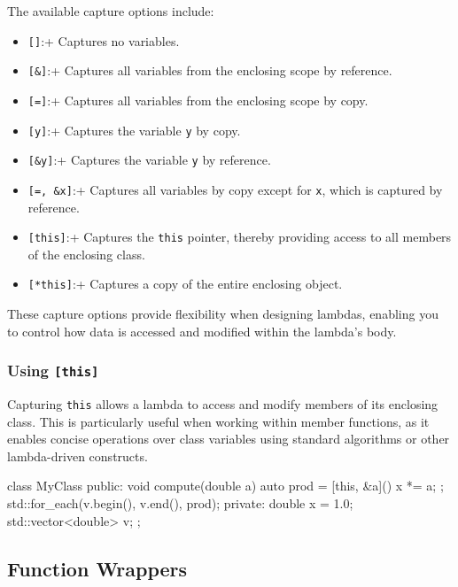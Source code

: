 \vspace{0.5em}

The available capture options include:

\begin{itemize}
    \item \texttt{[]}:+ Captures no variables.
    \item \texttt{[\&]}:+ Captures all variables from the enclosing scope by reference.
    \item \texttt{[=]}:+ Captures all variables from the enclosing scope by copy.
    \item \texttt{[y]}:+ Captures the variable \texttt{y} by copy.
    \item \texttt{[\&y]}:+ Captures the variable \texttt{y} by reference.
    \item \texttt{[=, \&x]}:+ Captures all variables by copy except for \texttt{x}, which is captured by reference.
    \item \texttt{[this]}:+ Captures the \texttt{this} pointer, thereby providing access to all members of the enclosing class.
    \item \texttt{[*this]}:+ Captures a copy of the entire enclosing object.
\end{itemize}

\vspace{0.5em}

These capture options provide flexibility when designing lambdas, enabling you to control how data is accessed and modified within the lambda's body.

\subsubsection{Using \texttt{[this]}}

Capturing \texttt{this} allows a lambda to access and modify members of its enclosing class. This is particularly useful when working within member functions, as it enables concise operations over class variables using standard algorithms or other lambda-driven constructs.

\begin{codeblock}[language=C++]
class MyClass {
public:
    void compute(double a) {
        auto prod = [this, &a]() { x *= a; };
        std::for_each(v.begin(), v.end(), prod);
    }
private:
    double x = 1.0;
    std::vector<double> v;
};
\end{codeblock}

\subsection{Function Wrappers}


